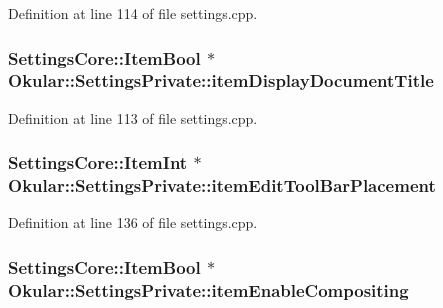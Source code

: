 Definition at line 114 of file settings.\+cpp.

\hypertarget{classOkular_1_1SettingsPrivate_a77ac0114dc2afc51a248c5facd23f992}{
\subsubsection[{item\+Display\+Document\+Title}]{\setlength{\rightskip}{0pt plus 5cm}Settings\+Core\+::\+Item\+Bool $\ast$ Okular\+::\+Settings\+Private\+::item\+Display\+Document\+Title}}\label{classOkular_1_1SettingsPrivate_a77ac0114dc2afc51a248c5facd23f992}


Definition at line 113 of file settings.\+cpp.

\hypertarget{classOkular_1_1SettingsPrivate_a75b021bc97a8a2eb940ff849575e3c5c}{
\subsubsection[{item\+Edit\+Tool\+Bar\+Placement}]{\setlength{\rightskip}{0pt plus 5cm}Settings\+Core\+::\+Item\+Int $\ast$ Okular\+::\+Settings\+Private\+::item\+Edit\+Tool\+Bar\+Placement}}\label{classOkular_1_1SettingsPrivate_a75b021bc97a8a2eb940ff849575e3c5c}


Definition at line 136 of file settings.\+cpp.

\hypertarget{classOkular_1_1SettingsPrivate_a5fd46d913aaaf8001026e7a4c6409910}{
\subsubsection[{item\+Enable\+Compositing}]{\setlength{\rightskip}{0pt plus 5cm}Settings\+Core\+::\+Item\+Bool $\ast$ Okular\+::\+Settings\+Private\+::item\+Enable\+Compositing}}\label{classOkular_1_1SettingsPrivate_a5fd46d913aaaf8001026e7a4c6409910}


